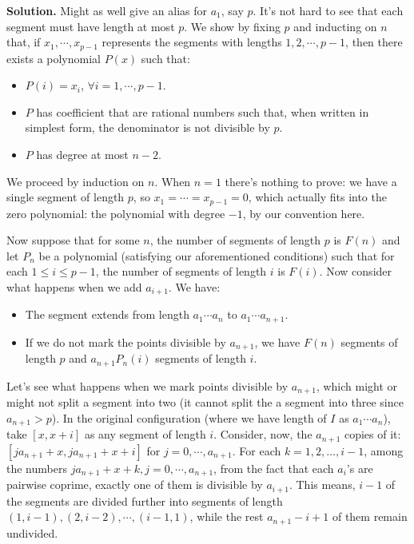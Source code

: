 \documentclass[11pt,a4paper]{article}
\begin{document}
\begin{enumerate}
	\textbf{Solution.} Might as well give an alias for $a_1$, say $p$. 
	It's not hard to see that each segment must have length at most $p$. We show by fixing $p$ and inducting on $n$ that, if $x_1, \cdots , x_{p-1}$ represents the segments with lengths $1, 2, \cdots , p-1$, then there exists a polynomial $P(x)$ such that: 
	\begin{itemize}
		\item $P(i)=x_i$, $\forall i=1, \cdots , p-1$. 
		\item $P$ has coefficient that are rational numbers such that, when written in simplest form, the denominator is not divisible by $p$. 
		\item $P$ has degree at most $n-2$. 
	\end{itemize}
	We proceed by induction on $n$. When $n=1$ there's nothing to prove: we have a single segment of length $p$, so $x_1=\cdots =x_{p-1}=0$, which actually fits into the zero polynomial: the polynomial with degree $-1$, by our convention here. 
	
	Now suppose that for some $n$, the number of segments of length $p$ is $F(n)$ and let $P_n$ be a polynomial (satisfying our aforementioned conditions) such that for each $1\le i\le p-1$, the number of segments of length $i$ is $F(i)$. Now consider what happens when we add $a_{i+1}$. We have: 
	\begin{itemize}
		\item The segment extends from length $a_1\cdots a_n$ to $a_1\cdots a_{n+1}$. 
		
		\item If we do not mark the points divisible by $a_{n+1}$, we have $F(n)$ segments of length $p$ and $a_{n+1}P_n(i)$ segments of length $i$. 
	\end{itemize}
	Let's see what happens when we mark points divisible by $a_{n+1}$, which might or might not split a segment into two (it cannot split the a segment into three since $a_{n+1}>p$). 
	In the original configuration (where we have length of $I$ as $a_1\cdots a_n$), take $[x, x+i]$ as any segment of length $i$. 
	Consider, now, the $a_{n+1}$ copies of it: $[ja_{n+1}+x, ja_{n+1}+x+i]$ for $j=0, \cdots , a_{n+1}$. 
	For each $k=1, 2, \dots , i-1$, among the numbers $ja_{n+1}+x+k, j=0, \cdots , a_{n+1}$, from the fact that each $a_i$'s are pairwise coprime, exactly one of them is divisible by $a_{i+1}$. This means, $i-1$ of the segments are divided further into segments of length $(1, i-1), (2, i-2), \cdots , (i-1, 1)$, while the rest $a_{n+1}-i+1$ of them remain undivided. 
	

\end{enumerate}
\end{document}
